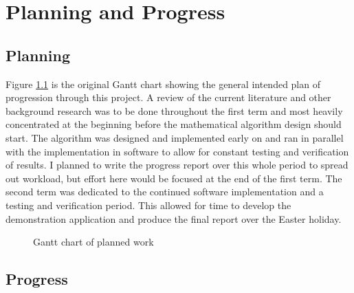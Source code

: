 \chapter{Planning and Progress}

\section{Planning}


Figure \ref{planningGantt} is the original Gantt chart showing the general intended plan of progression through this project. A review of the current literature and other background research was to be done throughout the first term and most heavily concentrated at the beginning before the mathematical algorithm design should start. The algorithm was designed and implemented early on and ran in parallel with the implementation in software to allow for constant testing and verification of results. I planned to write the progress report over this whole period to spread out workload, but effort here would be focused at the end of the first term. The second term was dedicated to the continued software implementation and a testing and verification period. This allowed for time to develop the demonstration application and produce the final report over the Easter holiday. 

\begin{figure}[ht!]
    \caption{Gantt chart of planned work}
    \label{planningGantt}
\end{figure}

\section{Progress}

